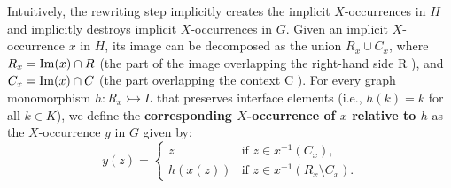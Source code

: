 \begin{definition}
    Intuitively, the rewriting step implicitly creates the implicit $X$-occurrences in $H$ and implicitly destroys implicit $X$-occurrences in $G$. Given an implicit $X$-occurrence $x$ in $H$, its image can be decomposed as the union $R_x \cup C_x$, where $R_x = \operatorname{Im}(x) \cap R$ (the part of the image overlapping the right-hand side R ), and $C_x = \operatorname{Im}(x) \cap C$ (the part overlapping the context C ). For every graph monomorphism $h : R_x \rightarrowtail L$ that preserves interface elements (i.e., \( h(k) = k \) for all \( k \in K \)), we define the \textbf{corresponding $X$-occurrence of $x$ relative to $h$} as the $X$-occurrence $y$ in $G$ given by:
        $$
        y(z) = 
        \begin{cases}
        z & \text{if } z \in x^{-1}(C_x), \\
        h(x(z)) & \text{if } z \in x^{-1}(R_x \setminus C_x).
        \end{cases}
        $$
   \end{definition} 






